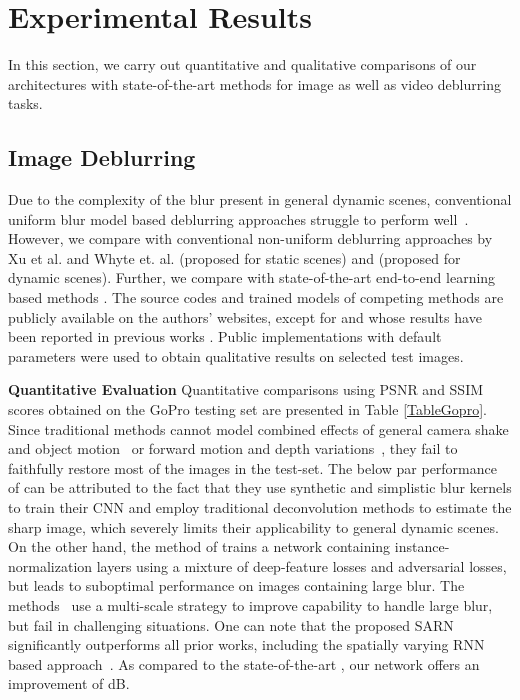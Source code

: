 \documentclass[10pt,twocolumn,letterpaper]{article}
\begin{document}
\section{Experimental Results}

In this section, we carry out quantitative and qualitative comparisons of our architectures with state-of-the-art methods for image as well as video deblurring tasks.

\subsection{Image Deblurring}
Due to the complexity of the blur present in general dynamic scenes, conventional uniform blur model based deblurring approaches struggle to perform well~\cite{nah2017deep}. However, we compare with conventional non-uniform deblurring approaches by Xu et al. \cite{xu2013unnatural} and Whyte et. al. \cite{whyte2012non} (proposed for static scenes)  and \cite{hyun2013dynamic} (proposed for dynamic scenes). Further, we compare with state-of-the-art end-to-end learning based methods \cite{nah2017deep,kupyn2017deblurgan,zhang2018dynamic,tao2018scale}. The source codes and trained models of competing methods are publicly available on the authors' websites, except for \cite{hyun2013dynamic} and \cite{zhang2018dynamic} whose results have been reported in previous works \cite{zhang2018dynamic,tao2018scale}. Public implementations with default parameters were used to obtain qualitative results on selected test images.


\noindent \textbf{Quantitative Evaluation}
Quantitative comparisons using PSNR and SSIM scores obtained on the GoPro testing set are presented in Table \ref{TableGopro}. Since traditional methods cannot model combined effects of general camera shake and object motion~\cite{xu2013unnatural,whyte2012non} or forward motion and depth variations~\cite{hyun2013dynamic}, they fail to faithfully restore most of the images in the test-set. The below par performance of \cite{sun2015learning,gong2017motion} can be attributed to the fact that they use synthetic and simplistic blur kernels to train their CNN and employ traditional deconvolution methods to estimate the sharp image, which severely limits their applicability to general dynamic scenes. On the other hand, the method of \cite{kupyn2017deblurgan} trains a network containing instance-normalization layers using a mixture of deep-feature losses and adversarial losses, but leads to suboptimal performance on images containing large blur. The methods~ \cite{nah2017deep,tao2018scale} use a multi-scale strategy to improve capability to handle large blur, but fail in challenging situations. One can note that the proposed SARN significantly outperforms all prior works, including the spatially varying RNN based approach~\cite{zhang2018dynamic}. As compared to the state-of-the-art \cite{tao2018scale}, our network offers an improvement of  dB. 
 
\end{document}
